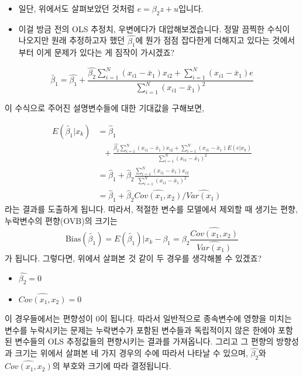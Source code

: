 \documentclass[
]{book}
\begin{document}
\begin{itemize}
\item
  일단, 위에서도 살펴보았던 것처럼 \(e = \beta_2z + u\)입니다.
\item
  이걸 방금 전의 OLS 추정치, 우변에다가 대압해보겠습니다. 정말 끔찍한 수식이 나오지만 원래 추정하고자 했던 \(\hat{\beta_1}\)에 뭔가 점점 잡다한게 더해지고 있다는 것에서부터 이게 문제가 있다는 게 짐작이 가시겠죠?
\end{itemize}

\begin{equation*}
\tilde{\beta_1}=\hat{\beta_1} + \frac{\hat{\beta_2}\sum^N_{i=1}(x_{i1}-\bar{x}_1)x_{i2} + \sum^N_{i=1}(x_{i1}-\bar{x}_1)e}{\sum^N_{i=1}(x_{i1}-\bar{x}_1)^2}
\end{equation*}

이 수식으로 주어진 설명변수들에 대한 기대값을 구해보면,

\begin{equation*}
\begin{aligned}
E(\tilde{\beta_1}|x_k)&= \hat{\beta}_1\\
&\:\:\:+\frac{\hat{\beta_2}\sum^N_{i=1}(x_{i1}-\bar{x}_1)x_{i2} + \sum^N_{i=1}(x_{i1}-\bar{x}_1)E(e|x_k)}{\sum^N_{i=1}(x_{i1}-\bar{x}_1)^2}\\
&= \hat{\beta}_1 + \hat{\beta}_2\frac{\sum^N_{i=1}(x_{i1}-\bar{x}_1)x_{i2}}{\sum^N_{i=1}(x_{i1}-\bar{x}_1)^2}\\
&= \hat{\beta}_1 + \hat{\beta}_2\widehat{Cov(x_1, x_2)}/\widehat{Var(x_1)}
\end{aligned}
\end{equation*}
라는 결과를 도출하게 됩니다. 따라서, 적절한 변수를 모델에서 제외할 때 생기는 편향, 누락변수의 편향(OVB)의 크기는
\begin{equation*}
\text{Bias}(\tilde{\beta_1}) = E(\tilde{\beta_1})|x_k - \beta_1 = \beta_2\frac{\widehat{Cov(x_1, x_2)}}{\widehat{Var(x_1)}}
\end{equation*}
가 됩니다. 그렇다면, 위에서 살펴본 것 같이 두 경우를 생각해볼 수 있겠죠?

\begin{itemize}
\item
  \(\hat{\beta_2}=0\)
\item
  \(\widehat{Cov(x_1, x_2)}=0\)
\end{itemize}

이 경우들에서는 편향성이 0이 됩니다. 따라서 일반적으로 종속변수에 영향을 미치는 변수를 누락시키는 문제는 누락변수가 포함된 변수들과 독립적이지 않은 한에야 포함된 변수들의 OLS 추정값들의 편향시키는 결과를 가져옵니다. 그리고 그 편향의 방향성과 크기는 위에서 살펴본 네 가지 경우의 수에 따라서 나타날 수 있으며, \(\hat{\beta_2}\)와 \(\widehat{Cov(x_1, x_2)}\)의 부호와 크기에 따라 결정됩니다.
\end{document}
